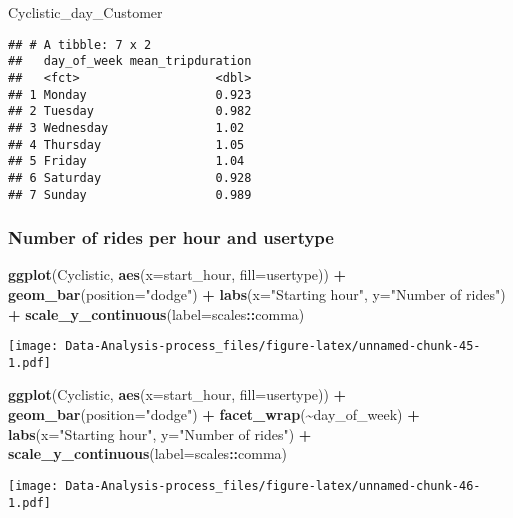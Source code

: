 \documentclass[
]{article}
\newenvironment{Shaded}{\begin{snugshade}}{\end{snugshade}}
\newcommand{\AttributeTok}[1]{\textcolor[rgb]{0.13,0.29,0.53}{#1}}
\newcommand{\FunctionTok}[1]{\textcolor[rgb]{0.13,0.29,0.53}{\textbf{#1}}}
\newcommand{\NormalTok}[1]{#1}
\newcommand{\SpecialCharTok}[1]{\textcolor[rgb]{0.81,0.36,0.00}{\textbf{#1}}}
\newcommand{\StringTok}[1]{\textcolor[rgb]{0.31,0.60,0.02}{#1}}
\begin{document}
\begin{Shaded}
\begin{Highlighting}[]
\NormalTok{Cyclistic\_day\_Customer}
\end{Highlighting}
\end{Shaded}

\begin{verbatim}
## # A tibble: 7 x 2
##   day_of_week mean_tripduration
##   <fct>                   <dbl>
## 1 Monday                  0.923
## 2 Tuesday                 0.982
## 3 Wednesday               1.02 
## 4 Thursday                1.05 
## 5 Friday                  1.04 
## 6 Saturday                0.928
## 7 Sunday                  0.989
\end{verbatim}

\hypertarget{number-of-rides-per-hour-and-usertype}{%
\subsubsection{Number of rides per hour and
usertype}\label{number-of-rides-per-hour-and-usertype}}

\begin{Shaded}
\begin{Highlighting}[]
\FunctionTok{ggplot}\NormalTok{(Cyclistic, }\FunctionTok{aes}\NormalTok{(}\AttributeTok{x=}\NormalTok{start\_hour, }\AttributeTok{fill=}\NormalTok{usertype)) }\SpecialCharTok{+} 
  \FunctionTok{geom\_bar}\NormalTok{(}\AttributeTok{position=}\StringTok{"dodge"}\NormalTok{) }\SpecialCharTok{+}
  \FunctionTok{labs}\NormalTok{(}\AttributeTok{x=}\StringTok{"Starting hour"}\NormalTok{, }\AttributeTok{y=}\StringTok{"Number of rides"}\NormalTok{) }\SpecialCharTok{+} 
  \FunctionTok{scale\_y\_continuous}\NormalTok{(}\AttributeTok{label=}\NormalTok{scales}\SpecialCharTok{::}\NormalTok{comma)}
\end{Highlighting}
\end{Shaded}

\texttt{[image: Data-Analysis-process\_files/figure-latex/unnamed-chunk-45-1.pdf]}

\begin{Shaded}
\begin{Highlighting}[]
\FunctionTok{ggplot}\NormalTok{(Cyclistic, }\FunctionTok{aes}\NormalTok{(}\AttributeTok{x=}\NormalTok{start\_hour, }\AttributeTok{fill=}\NormalTok{usertype)) }\SpecialCharTok{+} 
  \FunctionTok{geom\_bar}\NormalTok{(}\AttributeTok{position=}\StringTok{"dodge"}\NormalTok{) }\SpecialCharTok{+}
  \FunctionTok{facet\_wrap}\NormalTok{(}\SpecialCharTok{\textasciitilde{}}\NormalTok{day\_of\_week) }\SpecialCharTok{+}
  \FunctionTok{labs}\NormalTok{(}\AttributeTok{x=}\StringTok{"Starting hour"}\NormalTok{, }\AttributeTok{y=}\StringTok{"Number of rides"}\NormalTok{) }\SpecialCharTok{+} 
  \FunctionTok{scale\_y\_continuous}\NormalTok{(}\AttributeTok{label=}\NormalTok{scales}\SpecialCharTok{::}\NormalTok{comma)}
\end{Highlighting}
\end{Shaded}

\texttt{[image: Data-Analysis-process\_files/figure-latex/unnamed-chunk-46-1.pdf]}
\end{document}
